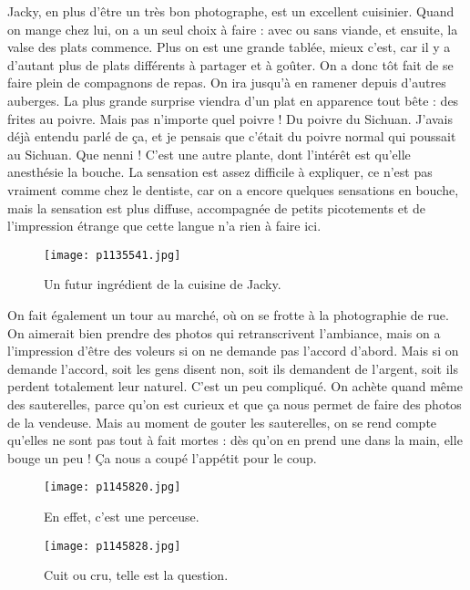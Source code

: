 \documentclass{book}
\begin{document}
Jacky, en plus d'être un très bon photographe, est un excellent cuisinier. Quand on mange chez lui, on a un seul choix à faire : avec ou sans viande, et ensuite, la valse des plats commence. Plus on est une grande tablée, mieux c'est, car il y a d'autant plus de plats différents à partager et à goûter. On a donc tôt fait de se faire plein de compagnons de repas. On ira jusqu'à en ramener depuis d'autres auberges. La plus grande surprise viendra d'un plat en apparence tout bête : des frites au poivre. Mais pas n'importe quel poivre ! Du poivre du Sichuan. J'avais déjà entendu parlé de ça, et je pensais que c'était du poivre normal qui poussait au Sichuan. Que nenni ! C'est une autre plante, dont l'intérêt est qu'elle anesthésie la bouche. La sensation est assez difficile à expliquer, ce n'est pas vraiment comme chez le dentiste, car on a encore quelques sensations en bouche, mais la sensation est plus diffuse, accompagnée de petits picotements et de l'impression étrange que cette langue n'a rien à faire ici.


\begin{figure}[h]
\centering
\texttt{[image: p1135541.jpg]}
\caption*{Un futur ingrédient de la cuisine de Jacky.}
\end{figure}

On fait également un tour au marché, où on se frotte à la photographie de rue. On aimerait bien prendre des photos qui retranscrivent l'ambiance, mais on a l'impression d'être des voleurs si on ne demande pas l'accord d'abord. Mais si on demande l'accord, soit les gens disent non, soit ils demandent de l'argent, soit ils perdent totalement leur naturel. C'est un peu compliqué. On achète quand même des sauterelles, parce qu'on est curieux et que ça nous permet de faire des photos de la vendeuse. Mais au moment de gouter les sauterelles, on se rend compte qu'elles ne sont pas tout à fait mortes : dès qu'on en prend une dans la main, elle bouge un peu ! Ça nous a coupé l'appétit pour le coup.


\begin{figure}[h]
\centering
\texttt{[image: p1145820.jpg]}
\caption*{En effet, c'est une perceuse.}
\end{figure}


\begin{figure}[h]
\centering
\texttt{[image: p1145828.jpg]}
\caption*{Cuit ou cru, telle est la question.}
\end{figure}
\end{document}
